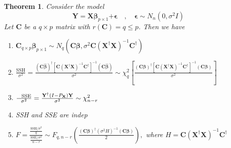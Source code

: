 \documentclass{article}
\newtheorem{theorem}{Theorem}
\begin{document}
\begin{theorem}
Consider the model%
\begin{equation*}
\mathbf{Y=X\beta }_{p\times 1}\mathbf{+\epsilon \quad ,\quad \epsilon }\sim
N_{n}\left( 0,\sigma ^{2}I\right)
\end{equation*}%
Let $\mathbf{C}$ be a $q\times p$ matrix with $r\left( \mathbf{C}\right)
=q\leq p$. Then we have

\begin{enumerate}
\item $\mathbf{C}_{q\times p}\mathbf{\hat{\beta}}_{p\times 1}\sim
N_{q}\left( \mathbf{C\beta },\sigma ^{2}\mathbf{C}\left( \mathbf{X}^{\dagger
}\mathbf{X}\right) ^{-1}\mathbf{C}^{\dagger }\right) $

\item $\frac{\text{SSH}}{\sigma ^{2}}=\frac{\left( \mathbf{C\hat{\beta}}%
\right) ^{\dagger }\left[ \mathbf{C}\left( \mathbf{X}^{\dagger }\mathbf{X}%
\right) ^{-1}\mathbf{C}^{\dagger }\right] ^{-1}\left( \mathbf{C\hat{\beta}}%
\right) }{\sigma ^{2}}\sim \chi _{q}^{2}\left[ \frac{\left( \mathbf{C\beta }%
\right) ^{\dagger }\left[ \mathbf{C}\left( \mathbf{X}^{\dagger }\mathbf{X}%
\right) ^{-1}\mathbf{C}^{\dagger }\right] ^{-1}\left( \mathbf{C\beta }%
\right) }{\sigma ^{2}}\right] $

\item $\frac{\text{SSE}}{\sigma ^{2}}=\frac{\mathbf{Y}^{\dagger }\left( I-P_{%
\mathbf{X}}\right) \mathbf{Y}}{\sigma ^{2}}\sim \chi _{n-r}^{2}$

\item SSH and SSE are indep

\item $F=\frac{\frac{\text{SSH}/\sigma ^{2}}{q}}{\frac{\text{SSE}/\sigma ^{2}%
}{n-r}}\sim F_{q,n-r}\left( \frac{\left( \mathbf{C\beta }\right) ^{\dagger
}\left( \sigma ^{2}H\right) ^{-1}\left( \mathbf{C\beta }\right) }{2}\right)
, $ where $H=\mathbf{C}\left( \mathbf{X}^{\dagger }\mathbf{X}\right) ^{-1}%
\mathbf{C}^{\dagger }$
\end{enumerate}
\end{theorem}

\bigskip
\end{document}
